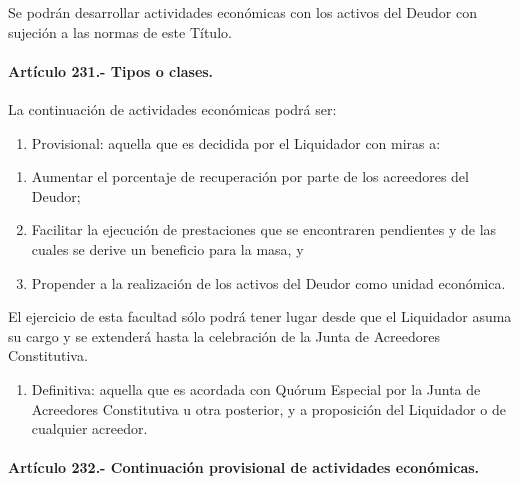 \documentclass[
]{book}
\providecommand{\tightlist}{%
  \setlength{\itemsep}{0pt}\setlength{\parskip}{0pt}}
\begin{document}
Se podrán desarrollar actividades económicas con los activos del Deudor con sujeción a las normas de este Título.

\hypertarget{artuxedculo-231.--tipos-o-clases.}{%
\paragraph*{Artículo 231.- Tipos o clases.}\label{artuxedculo-231.--tipos-o-clases.}}

La continuación de actividades económicas podrá ser:

\begin{enumerate}
\def\labelenumi{\arabic{enumi})}
\tightlist
\item
  Provisional: aquella que es decidida por el Liquidador con miras a:
\end{enumerate}

\begin{enumerate}
\def\labelenumi{\alph{enumi})}
\item
  Aumentar el porcentaje de recuperación por parte de los acreedores del Deudor;
\item
  Facilitar la ejecución de prestaciones que se encontraren pendientes y de las cuales se derive un beneficio para la masa, y
\item
  Propender a la realización de los activos del Deudor como unidad económica.
\end{enumerate}

El ejercicio de esta facultad sólo podrá tener lugar desde que el Liquidador asuma su cargo y se extenderá hasta la celebración de la Junta de Acreedores Constitutiva.

\begin{enumerate}
\def\labelenumi{\arabic{enumi})}
\setcounter{enumi}{1}
\tightlist
\item
  Definitiva: aquella que es acordada con Quórum Especial por la Junta de Acreedores Constitutiva u otra posterior, y a proposición del Liquidador o de cualquier acreedor.
\end{enumerate}

\hypertarget{artuxedculo-232.--continuaciuxf3n-provisional-de-actividades-econuxf3micas.}{%
\paragraph*{Artículo 232.- Continuación provisional de actividades económicas.}\label{artuxedculo-232.--continuaciuxf3n-provisional-de-actividades-econuxf3micas.}}
\end{document}
